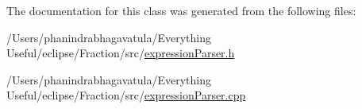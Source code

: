 The documentation for this class was generated from the following files\-:\begin{DoxyCompactItemize}
\item 
/\-Users/phanindrabhagavatula/\-Everything Useful/eclipse/\-Fraction/src/\hyperlink{expression_parser_8h}{expression\-Parser.\-h}\item 
/\-Users/phanindrabhagavatula/\-Everything Useful/eclipse/\-Fraction/src/\hyperlink{expression_parser_8cpp}{expression\-Parser.\-cpp}\end{DoxyCompactItemize}
